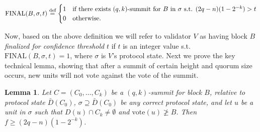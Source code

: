 \documentclass[12pt, fleqn]{article}
\newtheorem{lemma}{Lemma}
\newcommand{\vote}{\mathrm{vote}}
\newcommand{\final}{\mathrm{FINAL}}
\newcommand{\defeq}{\stackrel{\textup{def}}{=}}
\begin{document}
$$
   \final(B, \sigma, t) \defeq \begin{cases}
    1 &\mbox{if } \text{there exists $(q,k)$-summit for $B$ in $\sigma$ s.t. }(2q-n)(1-2^{-k})>t\\
    0 &\mbox{otherwise}.
    \end{cases}
$$

Now, based on the above definition we will refer to validator $V$ as having block $B$ \emph{finalized for confidence threshold} $t$ if $t$ is an integer value s.t. $\final(B,\sigma,t) = 1$, where $\sigma$ is $V$'s protocol state.
Next we prove the key technical lemma, showing that after a summit of certain height and quorum size occurs, new units will not vote against the vote of the summit.

\begin{lemma}\label{LemmaSummit}
Let $C = (C_0,\dots,C_k)$ be a $(q,k)$-summit for block $B$, relative to protocol state $\bar{D}(C_0)$, $\sigma\supseteq\bar{D}(C_0)$ be any correct protocol state, and let $u$ be a unit in $\sigma$ such that $D(u)\cap C_k\neq\emptyset$ and $\vote(u)\not\geq B$.
Then $f\geq (2q-n)(1-2^{-k})$.
\end{lemma}
\end{document}
